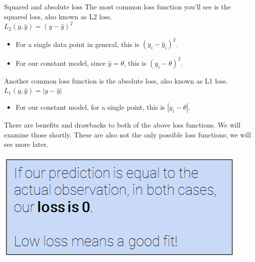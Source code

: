 \documentclass[aspectratio=169]{../latex_main/tntbeamer}  %
\begin{document}
	
	\begin{frame}{Squared and absolute loss}
	    The most common loss function you’ll see is the squared loss, also known as L2 loss.\\
	       \hspace{5cm} $L_2(y,\hat{y})  = (y-\hat{y})^2$
            \bigskip
	    \begin{itemize}
	        \item For a single data point in general, this is          $(y_i- \hat{y}_i)^2$.
	        \item For our constant model, since    $\hat{y} = \theta$, this is     $(y_i - \theta)^2$.
	    \end{itemize}
	    \bigskip
	    Another common loss function is the absolute loss, also known as L1 loss.\\
	       \hspace{5cm} $L_1(y, \hat{y}) = |y-\hat{y}|$
            \bigskip
	    \begin{itemize}
	        \item For our constant model, for a single point, this is      $|y_i - \theta|$.
	    \end{itemize}
	    There are benefits and drawbacks to both of the above loss functions. We will examine those shortly. These are also not the only possible loss functions; we will see more later.
	    
	    \vspace{-5cm}
	    \hspace{10cm}  \includegraphics[scale=.35]{Bild21}
	\end{frame}
	
\end{document}
